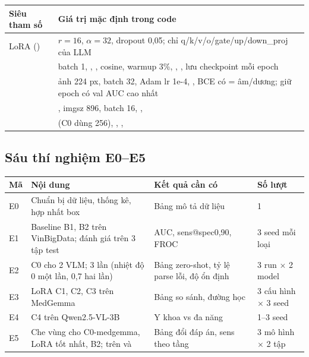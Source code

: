 \begin{center}
\small
\begin{tabularx}{\textwidth}{@{}l L@{}}
\toprule
\textbf{Siêu tham số} & \textbf{Giá trị mặc định trong code} \\
\midrule
LoRA () & $r=16$, $\alpha=32$, dropout 0,05; chỉ q/k/v/o/gate/up/down\_proj của LLM \\
 & batch 1, , , cosine, warmup 3\%, , , lưu checkpoint mỗi epoch \\
 & ảnh 224 px, batch 32, Adam lr 1e-4, , BCE có  = âm/dương; giữ epoch có val AUC cao nhất \\
 & , imgsz 896, batch 16, ,  \\
 &  (C0 dùng 256), , ,  \\
\bottomrule
\end{tabularx}
\end{center}

\subsection{Sáu thí nghiệm E0--E5}

\begin{center}
\small
\begin{tabularx}{\textwidth}{@{}l L L l@{}}
\toprule
\textbf{Mã} & \textbf{Nội dung} & \textbf{Kết quả cần có} & \textbf{Số lượt} \\
\midrule
E0 & Chuẩn bị dữ liệu, thống kê, hợp nhất box & Bảng mô tả dữ liệu & 1 \\
E1 & Baseline B1, B2 trên VinBigData; đánh giá trên 3 tập test & AUC, sens@spec0,90, FROC & 3 seed mỗi loại \\
E2 & C0 cho 2 VLM; 3 lần (nhiệt độ 0 một lần, 0,7 hai lần) & Bảng zero-shot, tỷ lệ parse lỗi, độ ổn định & 3 run $\times$ 2 model \\
E3 & LoRA C1, C2, C3 trên MedGemma & Bảng so sánh, đường học & 3 cấu hình $\times$ 3 seed \\
E4 & C4 trên Qwen2.5-VL-3B & Y khoa vs đa năng & 1--3 seed \\
E5 & Che vùng cho C0-medgemma, LoRA tốt nhất, B2; trên  và  & Bảng đổi đáp án, sens theo tầng & 3 mô hình $\times$ 2 tập \\
\bottomrule
\end{tabularx}
\end{center}

